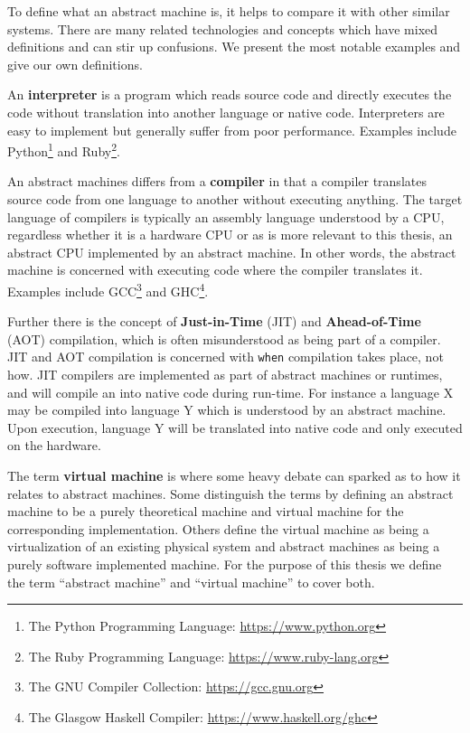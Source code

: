 To define what an abstract machine is, it helps to compare it with other similar
systems. There are many related technologies and concepts which have mixed
definitions and can stir up confusions. We present the most notable examples and
give our own definitions.

An \textbf{interpreter} is a program which reads source code and directly
executes the code without translation into another language or native
code. Interpreters are easy to implement but generally suffer from poor
performance\cite{NEEDED}. Examples include Python\footnote{The Python
  Programming Language: \url{https://www.python.org}} and Ruby\footnote{The
  Ruby Programming Language: \url{https://www.ruby-lang.org}}.

An abstract machines differs from a \textbf{compiler} in that a compiler
translates source code from one language to another without executing
anything. The target language of compilers is typically an assembly language
understood by a CPU, regardless whether it is a hardware CPU or as is more
relevant to this thesis, an abstract CPU implemented by an abstract machine. In
other words, the abstract machine is concerned with executing code where the
compiler translates it. Examples include GCC\footnote{The GNU Compiler
  Collection: \url{https://gcc.gnu.org}} and GHC\footnote{The Glasgow Haskell
  Compiler: \url{https://www.haskell.org/ghc}}.

Further there is the concept of \textbf{Just-in-Time} (JIT) and
\textbf{Ahead-of-Time} (AOT) compilation, which is often misunderstood as being
part of a compiler. JIT and AOT compilation is concerned with \texttt{when}
compilation takes place, not how. JIT compilers are implemented as part of
abstract machines or runtimes, and will compile an  into native code during run-time. For instance a language X
may be compiled into language Y which is understood by an abstract machine. Upon
execution, language Y will be translated into native code and only executed on
the hardware.

The term \textbf{virtual machine} is where some heavy debate can sparked as to
how it relates to abstract machines. Some distinguish the terms by defining an
abstract machine to be a purely theoretical machine and virtual machine for the
corresponding implementation. Others define the virtual machine as being a
virtualization of an existing physical system and abstract machines as being a
purely software implemented machine. For the purpose of this thesis we define
the term ``abstract machine'' and ``virtual machine'' to cover both.

